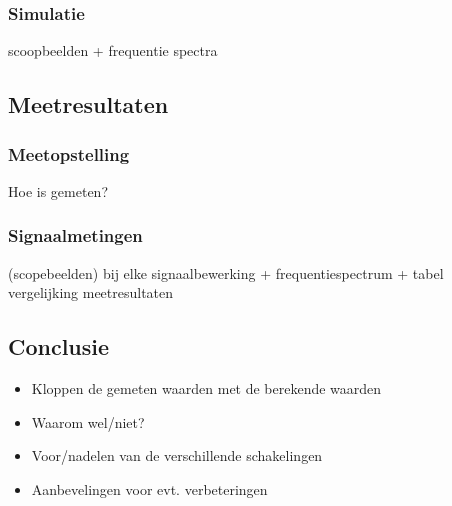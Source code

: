\documentclass[11pt,a4paper]{article}
\begin{document}
			 \subsubsection{Simulatie}
			 	scoopbeelden + frequentie spectra
		
		\subsection{Meetresultaten} 
			\subsubsection{Meetopstelling}
				Hoe is gemeten?
			\subsubsection{Signaalmetingen}
				(scopebeelden) bij elke signaalbewerking +
frequentiespectrum + tabel vergelijking meetresultaten
		
		\subsection{Conclusie}
			\begin{itemize}
				\item Kloppen de gemeten waarden met de berekende waarden
				\item Waarom wel/niet?
				\item Voor/nadelen van de verschillende schakelingen
				\item Aanbevelingen voor evt. verbeteringen
			\end{itemize}
	
	
	
\end{document}
